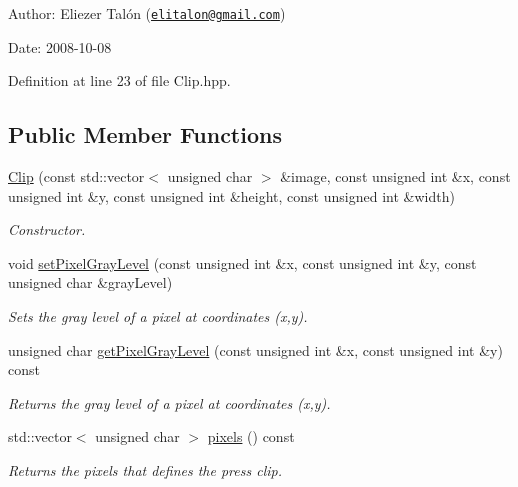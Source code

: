 \begin{Desc}
\item[Author:]Eliezer Talón (\href{mailto:elitalon@gmail.com}{\tt elitalon@gmail.com}) \end{Desc}
\begin{Desc}
\item[Date:]2008-10-08 \end{Desc}


Definition at line 23 of file Clip.hpp.\subsection*{Public Member Functions}
\begin{CompactItemize}
\item 
\hyperlink{class_clip_7e151616bf9c24c77aa5d1a0d341aa2a}{Clip} (const std::vector$<$ unsigned char $>$ \&image, const unsigned int \&x, const unsigned int \&y, const unsigned int \&height, const unsigned int \&width)
\begin{CompactList}\small\item\em Constructor. \item\end{CompactList}\item 
void \hyperlink{class_clip_454ff6070d0918e56a09a3f28ff430c3}{setPixelGrayLevel} (const unsigned int \&x, const unsigned int \&y, const unsigned char \&grayLevel)
\begin{CompactList}\small\item\em Sets the gray level of a pixel at coordinates (x,y). \item\end{CompactList}\item 
unsigned char \hyperlink{class_clip_334577b60ef51e42f977f952a29d1b66}{getPixelGrayLevel} (const unsigned int \&x, const unsigned int \&y) const 
\begin{CompactList}\small\item\em Returns the gray level of a pixel at coordinates (x,y). \item\end{CompactList}\item 
std::vector$<$ unsigned char $>$ \hyperlink{class_clip_c41089906750f03863854504db8f7e5c}{pixels} () const 
\begin{CompactList}\small\item\em Returns the pixels that defines the press clip. \item\end{CompactList}\item 

\end{CompactItemize}
